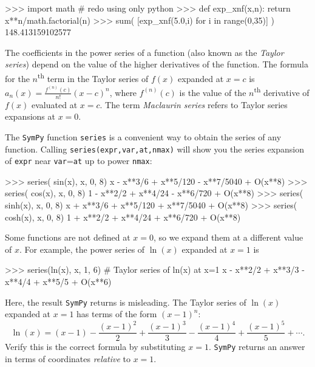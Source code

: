 \small
\begin{verbatimtab}
>>> import math                    # redo using only python 
>>> def exp_xnf(x,n): 
        return x**n/math.factorial(n)
>>> sum( [exp_xnf(5.0,i) for i in range(0,35)] )
148.413159102577
\end{verbatimtab}
\normalsize

\noindent
The coefficients in the power series of a function (also known as the \emph{Taylor series}) %
depend on the value of the higher derivatives of the function. 
The formula for the $n$\textsuperscript{th} term in the Taylor series of $f(x)$ expanded at $x=c$ is $a_n(x) = \frac{f^{(n)}(c)}{n!}(x-c)^n$,
where $f^{(n)}(c)$ is the value of the $n$\textsuperscript{th} derivative of $f(x)$ evaluated at $x=c$.
The term \emph{Maclaurin series} refers to Taylor series expansions at $x=0$.

The \texttt{SymPy} function \texttt{series} is a convenient way to obtain the series of any function.
Calling \texttt{series(expr,var,at,nmax)} 
will show you the series expansion of \texttt{expr} 
near \texttt{var}=\texttt{at} 
up to power \texttt{nmax}:

\small
\begin{verbatimtab}
>>> series( sin(x), x, 0, 8)
x - x**3/6 + x**5/120 - x**7/5040 + O(x**8)
>>> series( cos(x), x, 0, 8)
1 - x**2/2 + x**4/24 - x**6/720 + O(x**8)
>>> series( sinh(x), x, 0, 8)
x + x**3/6 + x**5/120 + x**7/5040 + O(x**8)
>>> series( cosh(x), x, 0, 8)
1 + x**2/2 + x**4/24 + x**6/720 + O(x**8)
\end{verbatimtab}
\normalsize


\noindent
Some functions are not defined at $x=0$, so we expand them at a different value of $x$.
For example, the power series of $\ln(x)$ expanded at $x=1$ is

\small
\begin{verbatimtab}
>>> series(ln(x), x, 1, 6)     # Taylor series of ln(x) at x=1
x - x**2/2 + x**3/3 - x**4/4 + x**5/5  + O(x**6)    
\end{verbatimtab}
\normalsize

\noindent
Here, the result \texttt{SymPy} returns is misleading.
The Taylor series of $\ln(x)$ expanded at $x=1$ has terms of the form $(x-1)^n$:
\[
  \ln(x) = (x-1) - \frac{(x-1)^2}{2} + \frac{(x-1)^3}{3} - \frac{(x-1)^4}{4} + \frac{(x-1)^5}{5} + \cdots.
\]
Verify this is the correct formula by substituting $x=1$.
\texttt{SymPy} returns an answer in terms of coordinates \emph{relative} to $x=1$.

